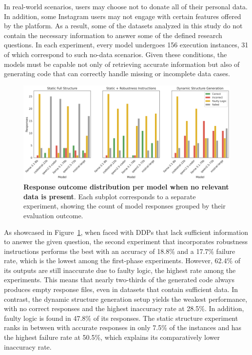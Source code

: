 \documentclass{DESSThesis}
\begin{document}
In real-world scenarios, users may choose not to donate all of their personal data. In addition, some Instagram users may not engage with certain features offered by the platform. As a result, some of the datasets analyzed in this study do not contain the necessary information to answer some of the defined research questions. In each experiment, every model undergoes 156 execution instances, 31 of which correspond to such no-data scenarios. Given these conditions, the models must be capable not only of retrieving accurate information but also of generating code that can correctly handle missing or incomplete data cases.

\begin{figure}[ht]
    \centering
    \includegraphics[width=\linewidth]{img/Results/First Experimental Phase/Response Outcome Distribution per Model - No Data.png}
    \caption[Response outcome distribution per model when no relevant data is present]{\textbf{Response outcome distribution per model when no relevant data is present}. Each subplot corresponds to a separate experiment, showing the count of model responses grouped by their evaluation outcome.}
    \label{fig:outcome_distribution_nodata}
\end{figure}

As showcased in Figure~\ref{fig:outcome_distribution_nodata}, when faced with DDPs that lack sufficient information to answer the given question, the second experiment that incorporates robustness instructions performs the best with an accuracy of 18.8\% and a 17.7\% failure rate, which is the lowest among the first-phase experiments. However, 62.4\% of its outputs are still inaccurate due to faulty logic, the highest rate among the experiments. This means that nearly two-thirds of the generated code always produces empty response files, even in datasets that contain sufficient data. In contrast, the dynamic structure generation setup yields the weakest performance, with no correct responses and the highest inaccuracy rate at 28.5\%. In addition, faulty logic is found in 47.8\% of its responses. The static structure experiment ranks in between with accurate responses in only 7.5\% of the instances and has the highest failure rate at 50.5\%, which explains its comparatively lower inaccuracy rate. 
\end{document}
